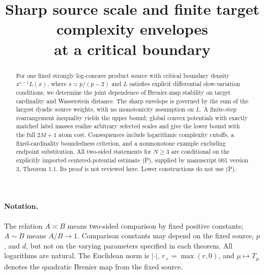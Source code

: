 
\title{Sharp source scale and finite target complexity envelopes\\at a critical boundary}

\maketitle
\begin{abstract}
For one fixed strongly log-concave product source with critical boundary density $x^{s-1}L(x)$, where $s=p/(p-2)$ and $L$ satisfies explicit differential slow-variation conditions, we determine the joint dependence of Brenier-map stability on target cardinality and Wasserstein distance. The sharp envelope is governed by the sum of the largest dyadic source weights, with no monotonicity assumption on $L$. A finite-step rearrangement inequality yields the upper bound; global convex potentials with exactly matched label masses realize arbitrary selected scales and give the lower bound with the full $2M+1$ atom cost. Consequences include logarithmic complexity cutoffs, a fixed-cardinality boundedness criterion, and a nonmonotone example excluding endpoint substitution. All two-sided statements for $N\ge3$ are conditional on the explicitly imported centered-potential estimate (P), supplied by manuscript 001 version 3, Theorem 1.1. Its proof is not reviewed here. Lower constructions do not use (P).
\end{abstract}
\SourceNote
\paragraph{Notation.} The relation $A\asymp B$ means two-sided comparison by fixed positive constants; $A\sim B$ means $A/B\to1$. Comparison constants may depend on the fixed source, $p$, and $d$, but not on the varying parameters specified in each theorem. All logarithms are natural. The Euclidean norm is $|\cdot|$, $r_+=\max(r,0)$, and $\mu\mapsto T_\mu$ denotes the quadratic Brenier map from the fixed source.


